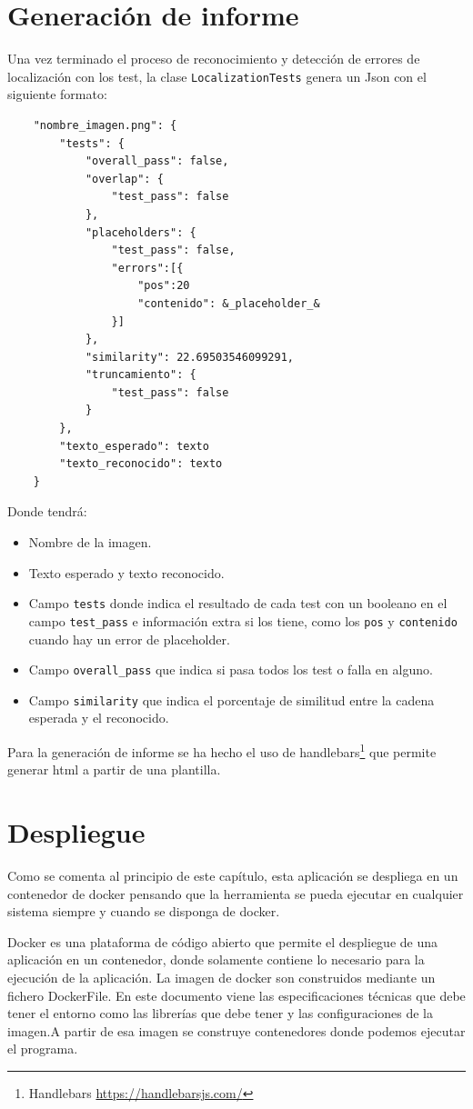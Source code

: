 \section{Generación de informe}
\label{sec:Generación informe}
Una vez terminado el proceso de reconocimiento y detección de errores de localización con los test, la clase \texttt{LocalizationTests} genera un Json con el siguiente formato:
\begin{verbatim}
	"nombre_imagen.png": {
		"tests": {
			"overall_pass": false,
			"overlap": {
				"test_pass": false
			},
			"placeholders": {
				"test_pass": false,
				"errors":[{
					"pos":20
					"contenido": &_placeholder_&
				}]
			},
			"similarity": 22.69503546099291,
			"truncamiento": {
				"test_pass": false
			}
		},
		"texto_esperado": texto
		"texto_reconocido": texto
	}
\end{verbatim}
Donde tendrá:
\begin{itemize}
	\item Nombre de la imagen.
	\item Texto esperado y texto reconocido.
	\item Campo \texttt{tests} donde indica el resultado de cada test con un booleano en el campo \texttt{test\_pass} e información extra si los tiene, como los \texttt{pos} y \texttt{contenido} cuando hay un error de placeholder.
	\item Campo \texttt{overall\_pass} que indica si pasa todos los test o falla en alguno.
	\item Campo \texttt{similarity} que indica el porcentaje de similitud entre la cadena esperada y el reconocido.
\end{itemize}

Para la generación de informe se ha hecho el uso de handlebars\footnote{Handlebars \url{https://handlebarsjs.com/}} que permite generar html a partir de una plantilla.
\section{Despliegue}
Como se comenta al principio de este capítulo, esta aplicación se despliega en un contenedor de docker pensando que la herramienta se pueda ejecutar en cualquier sistema siempre y cuando se disponga de docker.

Docker es una plataforma de código abierto que permite el despliegue de una aplicación en un contenedor, donde solamente contiene lo necesario para la ejecución de la aplicación.
La imagen de docker son construidos mediante un fichero 
DockerFile. En este documento viene las especificaciones técnicas que debe tener el entorno como las librerías que debe tener y las configuraciones de la imagen.A partir de esa imagen se construye contenedores donde podemos ejecutar el programa.

